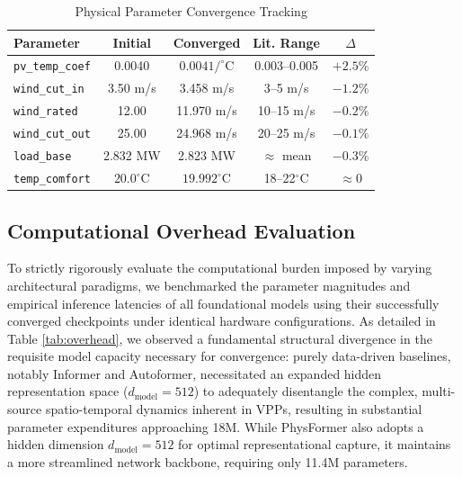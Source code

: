 \begin{table}[htbp]
\centering
\caption{Physical Parameter Convergence Tracking}
\label{tab:physical_params}
\footnotesize
\setlength{\tabcolsep}{3pt}
\begin{tabular*}{\columnwidth}{@{\extracolsep{\fill}}lcccc@{}}
\toprule
Parameter & Initial & Converged & Lit. Range & $\Delta$ \\
\midrule
\texttt{pv\_temp\_coef} & 0.0040 & $0.0041/^\circ$C & 0.003--0.005 & $+2.5\%$ \\
\texttt{wind\_cut\_in} & 3.50 m/s & 3.458 m/s & 3--5 m/s & $-1.2\%$ \\
\texttt{wind\_rated} & 12.00 & 11.970 m/s & 10--15 m/s & $-0.2\%$ \\
\texttt{wind\_cut\_out} & 25.00 & 24.968 m/s & 20--25 m/s & $-0.1\%$ \\
\texttt{load\_base} & 2.832 MW & 2.823 MW & $\approx$ mean & $-0.3\%$ \\
\texttt{temp\_comfort} & $20.0^\circ$C & $19.992^\circ$C & 18--22$^\circ$C & $\approx 0$ \\
\bottomrule
\end{tabular*}
\end{table}

\subsection{Computational Overhead Evaluation}
\label{subsec:overhead}

To strictly rigorously evaluate the computational burden imposed by varying architectural paradigms, we benchmarked the parameter magnitudes and empirical inference latencies of all foundational models using their successfully converged checkpoints under identical hardware configurations. As detailed in Table \ref{tab:overhead}, we observed a fundamental structural divergence in the requisite model capacity necessary for convergence: purely data-driven baselines, notably Informer and Autoformer, necessitated an expanded hidden representation space ($d_\text{model}=512$) to adequately disentangle the complex, multi-source spatio-temporal dynamics inherent in VPPs, resulting in substantial parameter expenditures approaching 18M. While PhysFormer also adopts a hidden dimension $d_\text{model}=512$ for optimal representational capture, it maintains a more streamlined network backbone, requiring only 11.4M parameters.

